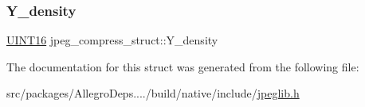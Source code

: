 \subsubsection{\texorpdfstring{Y\+\_\+density}{Y\_density}}
{\footnotesize\ttfamily \hyperlink{jmorecfg_8h_a805c2c164bdd38d72a30c46e84fb568b}{U\+I\+N\+T16} jpeg\+\_\+compress\+\_\+struct\+::\+Y\+\_\+density}



The documentation for this struct was generated from the following file\+:\begin{DoxyCompactItemize}
\item 
src/packages/\+Allegro\+Deps..../build/native/include/\hyperlink{jpeglib_8h}{jpeglib.\+h}\end{DoxyCompactItemize}
